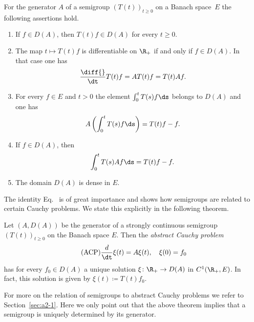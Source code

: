 \begin{proposition}\label{prop:a1-1.6}
For the generator $A$ of a semigroup $(T(t))_{t \geq 0}$ on a Banach space~$E$ the following assertions hold.
\begin{enumerate}[\upshape(i)]
\item
If\/ $f \in D(A)$, then $T(t)f \in D(A)$ for every $t \geq 0$.

\item
The map $t \mapsto T(t)f$ is differentiable on $\R_{+}$ if and only if\/ $f \in D(A)$.
In that case one has
\begin{equation}\label{eq:a1-1.2}
    \frac{\diff{}}{\dt} T(t)f = AT(t)f = T(t)Af .
\end{equation}
\item
For every $f \in E$ and $t > 0$ the element $\int_0^t T(s)f \ds$ belongs to $D(A)$ and one has
\begin{equation}\label{eq:a1-1.3}
    A\left(\int_0^t T(s)f \ds\right) = T(t)f - f  .
\end{equation}
\item
If\/ $f \in D(A)$, then
\begin{equation}\label{eq:a1-1.4}
    \int_0^t T(s)Af \ds = T(t)f - f  .
\end{equation}

\item
The domain $D(A)$ is dense in $E$.
\end{enumerate}
\end{proposition}
The identity Eq.~ is of great importance and shows how semigroups are related to certain Cauchy problems.
We state this explicitly in the following theorem.
\begin{theorem}\label{thm:a1-1.7}
Let $(A,D(A))$ be the generator of a strongly continuous semigroup $(T(t))_{t \geq 0}$ on the Banach space $E$.
Then the \emph{abstract Cauchy problem}
\begin{equation}\label{eq:a1-1.5.ACP} \tag{ACP}
\frac{d}{\dt}\xi(t) = A\xi(t), \quad \xi(0) = f_{0}
\end{equation}
has for every $f_{0} \in D(A)$ a unique solution $\xi \colon \R_{+} \to D(A)$ in $C^1(\R_{+},E)$.
In fact, this solution is given by $\xi(t) \coloneqq T(t)f_{0}$.
\end{theorem}
For more on the relation of semigroups to abstract Cauchy problems we refer to Section~\ref{sec:a2-1}.
Here we only point out that the above theorem implies that a semigroup is uniquely determined by its generator.


